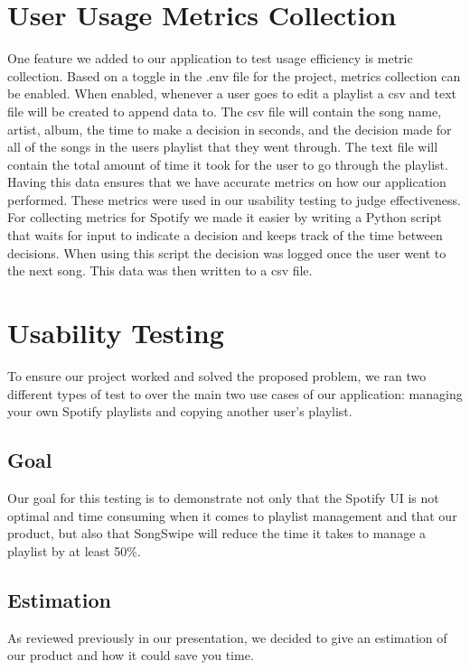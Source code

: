 \documentclass{article}
\begin{document}
\section{User Usage Metrics Collection}
\quad One feature we added to our application to test usage efficiency is metric collection. Based on a toggle in the .env file for the project, metrics collection can be enabled. When enabled, whenever a user goes to edit a playlist a csv and text file will be created to append data to. The csv file will contain the song name, artist, album, the time to make a decision in seconds, and the decision made for all of the songs in the users playlist that they went through. The text file will contain the total amount of time it took for the user to go through the playlist. Having this data ensures that we have accurate metrics on how our application performed. These metrics were used in our usability testing to judge effectiveness. For collecting metrics for Spotify we made it easier by writing a Python script that waits for input to indicate a decision and keeps track of the time between decisions. When using this script the decision was logged once the user went to the next song. This data was then written to a csv file. 

\section{Usability Testing}
\quad To ensure our project worked and solved the proposed problem, we ran two different types of test to over the main two use cases of our application: managing your own Spotify playlists and copying another user's playlist.

\subsection{Goal}
\quad Our goal for this testing is to demonstrate not only that the Spotify UI is not optimal and time consuming when it comes to playlist management and that our product, but also that SongSwipe will reduce the time it takes to manage a playlist by at least 50\%.

\subsection{Estimation}
\quad As reviewed previously in our presentation, we decided to give an estimation of our product and how it could save you time. \\
\end{document}
